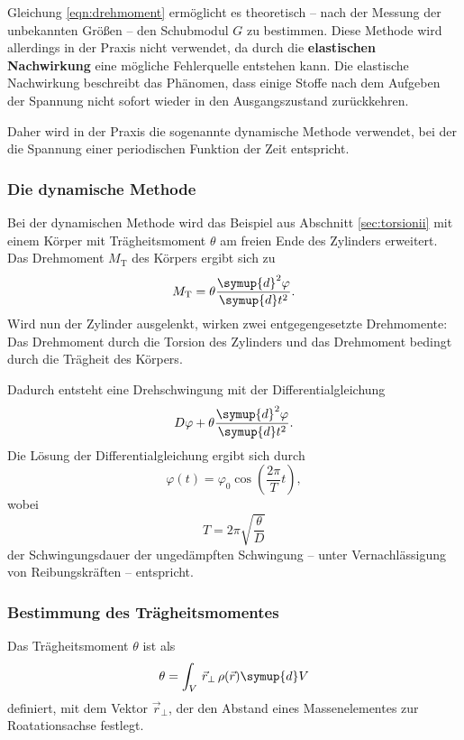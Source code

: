 Gleichung \eqref{eqn:drehmoment} ermöglicht es theoretisch -- nach der Messung der unbekannten
Größen -- den Schubmodul $G$ zu bestimmen.
Diese Methode wird allerdings in der Praxis nicht verwendet, da durch die \textbf{elastischen
Nachwirkung} eine mögliche Fehlerquelle entstehen kann.
Die elastische Nachwirkung beschreibt das Phänomen, dass einige Stoffe nach dem Aufgeben der
Spannung nicht sofort wieder in den Ausgangszustand zurückkehren.

Daher wird in der Praxis die sogenannte dynamische Methode verwendet, bei der die Spannung
einer periodischen Funktion der Zeit entspricht.

\subsubsection{Die dynamische Methode}
\label{sec:dynamisch}
Bei der dynamischen Methode wird das Beispiel aus Abschnitt \ref{sec:torsionii} mit einem Körper
mit Trägheitsmoment $\theta$ am freien Ende des Zylinders erweitert.
Das Drehmoment $M_{\mathrm{T}}$  des Körpers ergibt sich zu
\begin{equation}
	M_{\mathrm{T}} = \theta \frac{\symup{d}^2 \varphi}{\symup{d} t^2} \mathrm{.}
\end{equation}
Wird nun der Zylinder ausgelenkt, wirken zwei entgegengesetzte Drehmomente: Das Drehmoment
durch die Torsion des Zylinders und das Drehmoment bedingt durch die Trägheit des Körpers.

Dadurch entsteht eine Drehschwingung mit der Differentialgleichung
\begin{equation}
	D \varphi + \theta \frac{\symup{d}^2 \varphi}{\symup{d} t^2} \mathrm{.}
\end{equation}
Die Lösung der Differentialgleichung ergibt sich durch
\begin{equation}
	\varphi(t) = \varphi_0 \cos(\frac{2\pi}{T} t) \mathrm{,}
\end{equation}
wobei
\begin{equation}
	\label{eqn:toughtimes}
	T = 2\pi \sqrt{\frac{\theta}{D}}
\end{equation}
der Schwingungsdauer der ungedämpften Schwingung -- unter Vernachlässigung von
Reibungskräften -- entspricht.

\subsubsection{Bestimmung des Trägheitsmomentes}

Das Trägheitsmoment $\theta$ ist als
\begin{equation*}
	\theta = \int_V \, \vec{r}_{\perp} \, \rho(\vec{r}) \symup{d} V
\end{equation*}
definiert, mit dem Vektor $\vec{r}_{\perp}$, der den Abstand eines Massenelementes zur
Roatationsachse festlegt.


